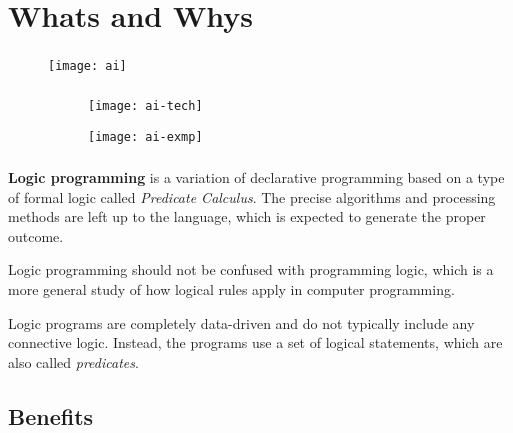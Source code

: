 \frame[plain]{\titlepage}


\section{Whats and Whys}

\begin{frame}
	\frametitle{\insertsection}
	\begin{figure}
		\texttt{[image: ai]}
	\end{figure}
\end{frame}

\begin{frame}
	\frametitle{\insertsection}
	\begin{figure}
		\centering
		\begin{subfigure}{.5\textwidth}
			\centering
			\texttt{[image: ai-tech]}
		\end{subfigure}%
		\begin{subfigure}{.5\textwidth}
			\centering
			\texttt{[image: ai-exmp]}
		\end{subfigure}
	\end{figure}
\end{frame}

\begin{frame}
	\frametitle{\insertsection}
	\justifying
	\textbf{Logic programming} is a variation of declarative programming based on a type of formal logic called \textit{Predicate Calculus}. The precise algorithms and processing methods are left up to the language, which is expected to generate the proper outcome.
	
	Logic programming should not be confused with programming logic, which is a more general study of how logical rules apply in computer programming.
	
	Logic programs are completely data-driven and do not typically include any connective logic. Instead, the programs use a set of logical statements, which are also called \textit{predicates}.
\end{frame}

\subsection{Benefits}

